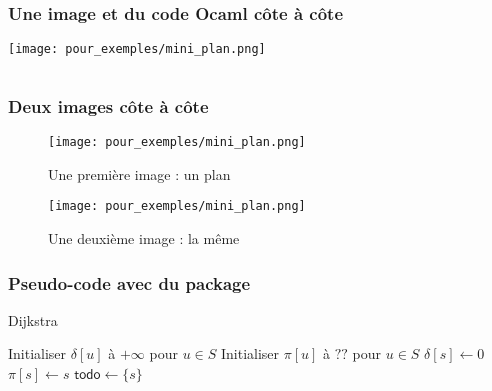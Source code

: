 \begin{frame}
  \frametitle{Une image et du code Ocaml côte à côte\esp}
  
  \begin{minipage}{0.28\textwidth}
    \texttt{[image: pour\_exemples/mini\_plan.png]}
  \end{minipage}
  \begin{minipage}{0.68\textwidth}
    \inputminted[firstline=1, lastline=10,firstnumber=1]{ocaml}{pour_exemples/test.ml}
  \end{minipage}
\end{frame}

\begin{frame}
  \frametitle{Deux images côte à côte}

  \begin{minipage}{0.49\textwidth}
	  \begin{figure}
		  \texttt{[image: pour\_exemples/mini\_plan.png]}
		  \caption*{Une première image : un plan}
	  \end{figure}
  \end{minipage}
  \hfill
  \begin{minipage}{0.49\textwidth}
    \begin{figure}
		  \texttt{[image: pour\_exemples/mini\_plan.png]}
		  \caption*{Une deuxième image : la même}
	  \end{figure}
  \end{minipage}
\end{frame}

\begin{frame}
	\small
	\frametitle{Pseudo-code avec  du package }
	\begin{algorithm}[H]
		\caption{\textsf{Dijkstra}}
		\BlankLine
		Initialiser $\delta[u]$ à $+\infty$ pour $u \in S$\;
 		Initialiser $\pi[u]$ à $\textsf{??}$ pour $u \in S$\;
  		$\delta[s] \gets 0$\;
 		$\pi[s] \gets s$\;
  		$\textsf{todo} \gets \{s\}$\;
 	\Return{$\delta$}
\end{algorithm}
\end{frame}


